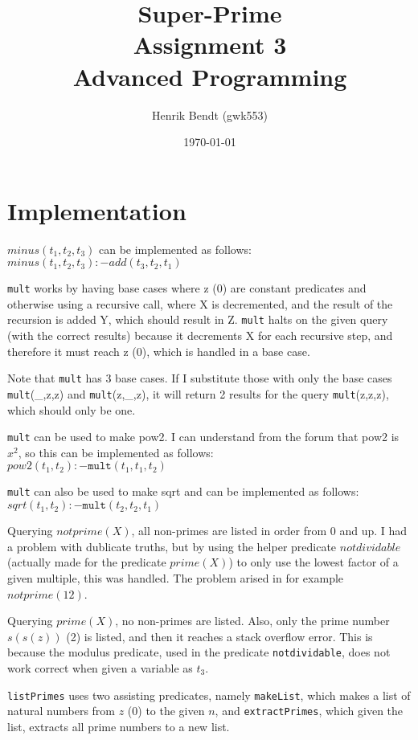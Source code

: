 \documentclass[a4paper, 10pt]{article}
\author{Henrik Bendt (gwk553)}
\title{Super-Prime\\Assignment 3\\Advanced Programming}
\date{\today}
\begin{document}
\maketitle
\pagebreak

\section*{Implementation}
$minus(t_1,t_2,t_3)$ can be implemented as follows:\\
$minus(t_1,t_2,t_3) :- add(t_3,t_2,t_1)$

\texttt{mult} works by having base cases where z (0) are constant predicates and otherwise using a recursive call, where X is decremented, and the result of the recursion is added Y, which should result in Z.
\texttt{mult} halts on the given query (with the correct results) because it decrements X for each recursive step, and therefore it must reach z (0), which is handled in a base case.

Note that \texttt{mult} has 3 base cases. If I substitute those with only the base cases \texttt{mult}(\_,z,z) and \texttt{mult}(z,\_,z), it will return 2 results for the query \texttt{mult}(z,z,z), which should only be one.

\texttt{mult} can be used to make pow2. I can understand from the forum that pow2 is $x^2$, so this can be implemented as follows:\\
$pow2(t_1,t_2) :- \texttt{mult}(t_1,t_1,t_2)$

\texttt{mult} can also be used to make sqrt and can be implemented as follows:\\
$sqrt(t_1,t_2) :- \texttt{mult}(t_2,t_2,t_1)$

Querying $notprime(X)$, all non-primes are listed in order from 0 and up. I had a problem with dublicate truths, but by using the helper predicate $notdividable$ (actually made for the predicate $prime(X)$) to only use the lowest factor of a given multiple, this was handled. The problem arised in for example $notprime(12)$.

Querying $prime(X)$, no non-primes are listed. Also, only the prime number $s(s(z))$ (2) is listed, and then it reaches a stack overflow error. This is because the modulus predicate, used in the predicate \texttt{notdividable}, does not work correct when given a variable as $t_3$.

\texttt{listPrimes} uses two assisting predicates, namely \texttt{makeList}, which makes a list of natural numbers from $z$ (0) to the given $n$, and \texttt{extractPrimes}, which given the list, extracts all prime numbers to a new list.
\end{document}
